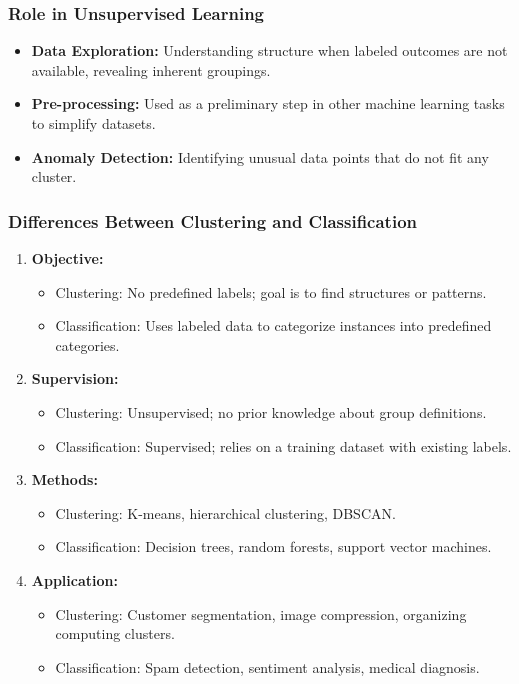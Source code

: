 \documentclass{beamer}
\begin{document}
\begin{frame}[fragile]
    \frametitle{Role in Unsupervised Learning}
    \begin{itemize}
        \item \textbf{Data Exploration:} Understanding structure when labeled outcomes are not available, revealing inherent groupings.
        \item \textbf{Pre-processing:} Used as a preliminary step in other machine learning tasks to simplify datasets.
        \item \textbf{Anomaly Detection:} Identifying unusual data points that do not fit any cluster.
    \end{itemize}
\end{frame}

\begin{frame}[fragile]
    \frametitle{Differences Between Clustering and Classification}
    \begin{enumerate}
        \item \textbf{Objective:} 
        \begin{itemize}
            \item Clustering: No predefined labels; goal is to find structures or patterns.
            \item Classification: Uses labeled data to categorize instances into predefined categories.
        \end{itemize}
        
        \item \textbf{Supervision:}
        \begin{itemize}
            \item Clustering: Unsupervised; no prior knowledge about group definitions.
            \item Classification: Supervised; relies on a training dataset with existing labels.
        \end{itemize}

        \item \textbf{Methods:} 
        \begin{itemize}
            \item Clustering: K-means, hierarchical clustering, DBSCAN.
            \item Classification: Decision trees, random forests, support vector machines.
        \end{itemize}

        \item \textbf{Application:}
        \begin{itemize}
            \item Clustering: Customer segmentation, image compression, organizing computing clusters.
            \item Classification: Spam detection, sentiment analysis, medical diagnosis.
        \end{itemize}
    \end{enumerate}
\end{frame}
\end{document}
